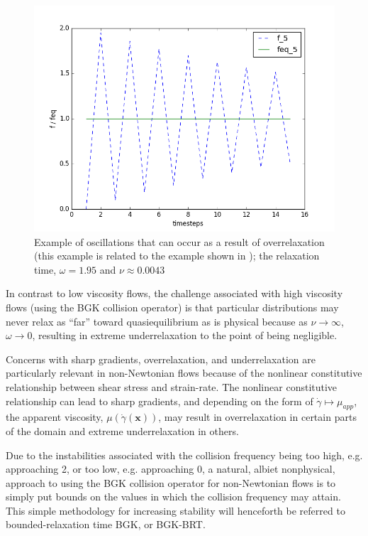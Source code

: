 \documentclass[pdftex,ms]{pittetd}
\newcommand{\pos}{\mathbf{x}}
\begin{document}
\begin{figure}
	\centering
    \includegraphics[width=\linewidth]{figs/overrelaxation_tau-0513}
    \caption{Example of oscillations that can occur as a result of overrelaxation (this example is related to the example shown in ); the relaxation time, $\omega = 1.95$ and $\nu \approx 0.0043$}
    \label{fig:overrelaxation}
\end{figure}

In contrast to low viscosity flows, the challenge associated with high viscosity flows (using the BGK collision operator) is that particular distributions may never relax as ``far'' toward quasiequilibrium as is physical because as $\nu \rightarrow \infty$, $\omega \rightarrow 0$, resulting in extreme underrelaxation to the point of being negligible. %

Concerns with sharp gradients, overrelaxation, and underrelaxation are particularly relevant in non-Newtonian flows because of the nonlinear constitutive relationship between shear stress and strain-rate.
The nonlinear constitutive relationship can lead to sharp gradients, and depending on the form of $\dot{\gamma} \mapsto \mu_{app}$, the apparent viscosity, $\mu(\dot{\gamma}(\pos))$, may result in overrelaxation in certain parts of the domain and extreme underrelaxation in others.

Due to the instabilities associated with the collision frequency being too high, e.g. approaching 2, or too low, e.g. approaching 0, a natural, albiet nonphysical, approach to using the BGK collision operator for non-Newtonian flows is to simply put bounds on the values in which the collision frequency may attain.
This simple methodology for increasing stability will henceforth be referred to bounded-relaxation time BGK, or BGK-BRT.
\end{document}
